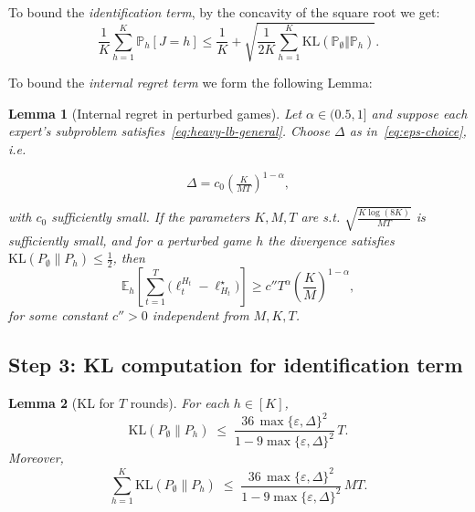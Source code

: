\documentclass[a4paper,14pt]{extarticle}
\theoremstyle{plain}
\newtheorem{lemma}{Lemma}
\begin{document}
To bound the \emph{identification term}, by the concavity of the square root we get:
\begin{equation}
\label{eq:identification_bound}
\frac{1}{K}\sum_{h=1}^K \mathbb{P}_h[J=h]
\le
\frac{1}{K} +
\sqrt{\frac{1}{2K}\sum_{h=1}^K \mathrm{KL}(\mathbb{P}_\emptyset\Vert \mathbb{P}_h)}.
\end{equation}

To bound the \emph{internal regret term} we form the following Lemma:

\begin{lemma}[Internal regret in perturbed games]
\label{lem:internal-perturbed}
Let $\alpha\in(0.5,1]$ and suppose each expert’s subproblem satisfies~\eqref{eq:heavy-lb-general}.
Choose $\Delta$ as in~\eqref{eq:eps-choice}, i.e.

\begin{equation}
\label{eq:delta-choice-lb}
\Delta = c_0\!\left(\tfrac{K}{MT}\right)^{1-\alpha},
\end{equation}

with $c_0$ sufficiently small.  If the parameters $K,M,T$ are s.t.  $\sqrt{\tfrac{K\log(8K)}{MT}}$ is sufficiently small, and for a perturbed game $h$ the divergence satisfies $\mathrm{KL}(P_\emptyset\|P_h) \le \tfrac{1}{2}$,
then
\begin{equation}
\label{eq:internal-perturbed-bound}
\mathbb E_h\!\left[\sum_{t=1}^T \bigl(\ell_t^{H_t} - \ell_{H_t}^\star\bigr)\right] \ge c''T^\alpha\!\left(\frac{K}{M}\right)^{1-\alpha},
\end{equation}
for some constant $c''>0$ independent from $M, K, T$.
\end{lemma}


\subsection{Step 3: KL computation for identification term}

\begin{lemma}[KL for $T$ rounds]
\label{lem:kl-total}
For each $h\in[K]$,
\begin{equation}
\mathrm{KL}(P_\emptyset\|P_h) \;\le\; \frac{36\,\max\{\varepsilon, \Delta\}^2}{1-9\max\{\varepsilon, \Delta\}^2}\,T.
\end{equation}
Moreover,
\begin{equation}
\sum_{h=1}^K \mathrm{KL}(P_\emptyset \| P_h)
\;\le\; \frac{36\,\max\{\varepsilon, \Delta\}^2}{1-9\max\{\varepsilon, \Delta\}^2}\,MT.
\end{equation}
\end{lemma}
\end{document}
